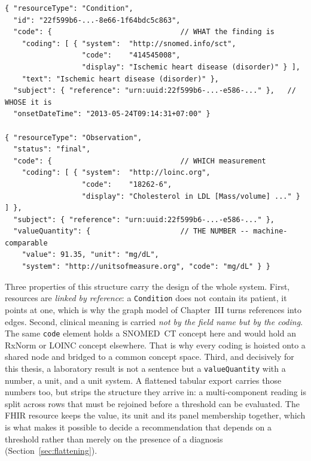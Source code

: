 \begin{lstlisting}[caption={Abridged FHIR R4 resources from a generated patient bundle:
a coded diagnosis and a numeric laboratory result.},label={lst:fhir},
basicstyle=\ttfamily\scriptsize,breaklines=true,frame=single,captionpos=b]
{ "resourceType": "Condition",
  "id": "22f599b6-...-8e66-1f64bdc5c863",
  "code": {                              // WHAT the finding is
    "coding": [ { "system":  "http://snomed.info/sct",
                  "code":    "414545008",
                  "display": "Ischemic heart disease (disorder)" } ],
    "text": "Ischemic heart disease (disorder)" },
  "subject": { "reference": "urn:uuid:22f599b6-...-e586-..." },   // WHOSE it is
  "onsetDateTime": "2013-05-24T09:14:31+07:00" }

{ "resourceType": "Observation",
  "status": "final",
  "code": {                              // WHICH measurement
    "coding": [ { "system":  "http://loinc.org",
                  "code":    "18262-6",
                  "display": "Cholesterol in LDL [Mass/volume] ..." } ] },
  "subject": { "reference": "urn:uuid:22f599b6-...-e586-..." },
  "valueQuantity": {                     // THE NUMBER -- machine-comparable
    "value": 91.35, "unit": "mg/dL",
    "system": "http://unitsofmeasure.org", "code": "mg/dL" } }
\end{lstlisting}

Three properties of this structure carry the design of the whole system. First, resources
are \emph{linked by reference}: a \texttt{Condition} does not contain its patient, it points
at one, which is why the graph model of Chapter~III turns references into edges. Second, clinical meaning is carried \emph{not by the field name but by the coding}. The same
\texttt{code} element holds a SNOMED~CT concept here and would hold an RxNorm or LOINC
concept elsewhere. That is why every coding is hoisted onto a shared node and bridged to a
common concept space. Third, and decisively for this thesis, a laboratory result is not a
sentence but a \texttt{valueQuantity} with a number, a unit, and a unit system. A flattened
tabular export carries those numbers too, but strips the structure they arrive in: a
multi-component reading is split across rows that must be rejoined before a threshold can be
evaluated. The FHIR resource keeps the value, its unit and its panel membership together,
which is what makes it possible to decide a recommendation that depends on a threshold rather
than merely on the presence of a diagnosis (Section~\ref{sec:flattening}).

